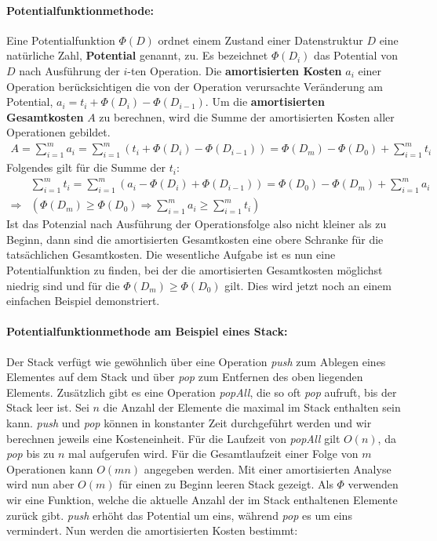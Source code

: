\documentclass[a4paper,12pt]{article}
\begin{document}
\paragraph{Potentialfunktionmethode:} \label{potentialfunktionsmethode} Eine Potentialfunktion $\Phi(D)$ ordnet einem Zustand einer Datenstruktur $D$ eine natürliche Zahl, \textbf{Potential} genannt, zu. Es bezeichnet $\Phi(D_i)$ das Potential von $D$ nach Ausführung der $i$-ten Operation. Die \textbf{amortisierten Kosten} $a_i$ einer Operation berücksichtigen die von der Operation verursachte Veränderung am Potential, \mbox{$a_i = t_i + \Phi(D_{i}) - \Phi(D_{i-1})$}. Um die \textbf{amortisierten Gesamtkosten} $A$ zu berechnen, wird die Summe der amortisierten Kosten aller Operationen gebildet. 
\begin{align*}
A = \sum_{i = 1}^{m} a_i =  \sum_{i = 1}^{m} \left(t_i + \Phi\left(D_{i}\right) - \Phi\left(D_{i-1}\right)\right) = \Phi\left(D_{m}\right) - \Phi\left(D_{0}\right) + \sum_{i = 1}^{m} t_i 
\end{align*}
Folgendes gilt für die Summe der $t_i$:
\begin{align*}
&\sum_{i = 1}^{m} t_i =  \sum_{i = 1}^{m} \left(a_i - \Phi\left(D_{i}\right) + \Phi\left(D_{i-1}\right)\right) = \Phi\left(D_{0}\right) - \Phi\left(D_{m}\right) + \sum_{i = 1}^{m} a_i \\
\Rightarrow &\left( \Phi\left(D_{m}\right) \geq \Phi\left(D_{0}\right) \Rightarrow \sum_{i = 1}^{m} a_i \geq \sum_{i = 1}^{m} t_i \right)
\end{align*}
Ist das Potenzial nach Ausführung der Operationsfolge also nicht kleiner als zu Beginn, dann sind die amortisierten Gesamtkosten eine obere Schranke für die tatsächlichen Gesamtkosten. Die wesentliche Aufgabe ist es nun eine Potentialfunktion zu finden, bei der die amortisierten Gesamtkosten möglichst niedrig sind und für die $\Phi\left(D_{m}\right) \geq \Phi\left(D_{0}\right)$ gilt. Dies wird jetzt noch an einem einfachen Beispiel demonstriert.

\paragraph{Potentialfunktionmethode am Beispiel eines Stack:} 
Der Stack verfügt wie gewöhnlich über eine Operation \textit{push} zum Ablegen eines Elementes auf dem Stack und über \textit{pop} zum Entfernen des oben liegenden Elements. Zusätzlich gibt es eine Operation \textit{popAll}, die so oft \textit{pop} aufruft, bis der Stack leer ist. Sei $n$ die Anzahl der Elemente die maximal im Stack enthalten sein kann. \textit{push} und \textit{pop} können in konstanter Zeit durchgeführt werden und wir berechnen jeweils eine Kosteneinheit. Für die Laufzeit von \textit{popAll} gilt $O(n)$, da \textit{pop} bis zu $n$ mal aufgerufen wird. Für die Gesamtlaufzeit einer Folge von $m$ Operationen kann $O(mn)$ angegeben werden. Mit einer amortisierten Analyse wird nun aber $O(m)$ für einen zu Beginn leeren Stack gezeigt. Als $\Phi$ verwenden wir eine Funktion, welche die aktuelle Anzahl der im Stack enthaltenen Elemente zurück gibt. \textit{push} erhöht das Potential um eins, während \textit{pop} es um eins vermindert. Nun werden die amortisierten Kosten bestimmt: 
\end{document}

